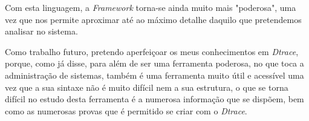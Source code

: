 \documentclass[conference,compsoc]{IEEEtran}
\begin{document}
Com esta linguagem, a \textit{Framework} torna-se ainda muito mais "poderosa", uma vez que nos permite aproximar até ao máximo detalhe daquilo que pretendemos analisar no sistema.

Como trabalho futuro, pretendo aperfeiçoar os meus conhecimentos em \textit{Dtrace}, porque, como já disse, para além de ser uma ferramenta poderosa, no que toca a administração de sistemas, também é uma ferramenta muito útil e acessível uma vez que a sua sintaxe não é muito difícil nem a sua estrutura, o que se torna difícil no estudo desta ferramenta é a numerosa informação que se dispõem, bem como as numerosas provas que é permitido se criar com o \textit{Dtrace}.
%
%



%
%
\end{document}
